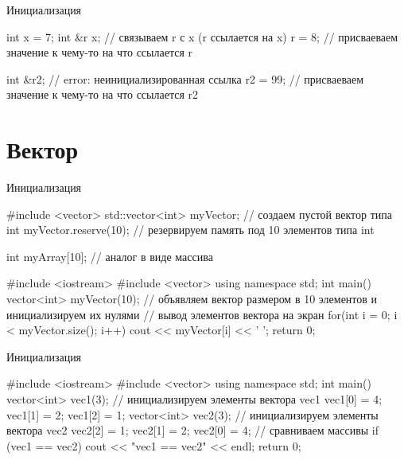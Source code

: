 \documentclass[
    9pt,
    hyperref={pdfencoding=unicode}
    ]{beamer}
\theoremstyle{definition}
\begin{document}
\begin{frame}[fragile]{Инициализация}
    \begin{cppcode}
        int x = 7;
        int &r {x}; // связываем r с x (r ссылается на x)
        r = 8;      // присваеваем значение к чему-то на что ссылается r
        
        int &r2;    // error: неинициализированная ссылка
        r2 = 99;    // присваеваем значение к чему-то на что ссылается r2
    \end{cppcode}
\end{frame}

\section{Вектор}
\begin{frame}[fragile]{Инициализация}
    \begin{cppcode}
        #include <vector>
        std::vector<int> myVector; // создаем пустой вектор типа int
        myVector.reserve(10);      // резервируем память под 10 элементов типа int
        
        int myArray[10]; // аналог в виде массива 
    \end{cppcode}

    \vspace{1em}
    \begin{cppcode}
        #include <iostream>
        #include <vector> 
        using namespace std;
        int main()
        {
            vector<int> myVector(10);   // объявляем вектор размером в 10 элементов и инициализируем их нулями
            // вывод элементов вектора на экран
            for(int i = 0; i < myVector.size(); i++)
                cout << myVector[i] << ' ';
            return 0;
        }
    \end{cppcode}
\end{frame}


\begin{frame}[fragile]{Инициализация}
    \begin{cppcode}
        #include <iostream>
        #include <vector>
        using namespace std;
        int main()
        {
            vector<int> vec1(3);
            // инициализируем элементы вектора vec1
            vec1[0] = 4;
            vec1[1] = 2;
            vec1[2] = 1;
            vector<int> vec2(3);
            // инициализируем элементы вектора vec2
            vec2[2] = 1;
            vec2[1] = 2;
            vec2[0] = 4;
            // сравниваем массивы
            if (vec1 == vec2) {
                cout << "vec1 == vec2" << endl;
            }
            return 0;
        }
    \end{cppcode}
\end{frame}
\end{document}
